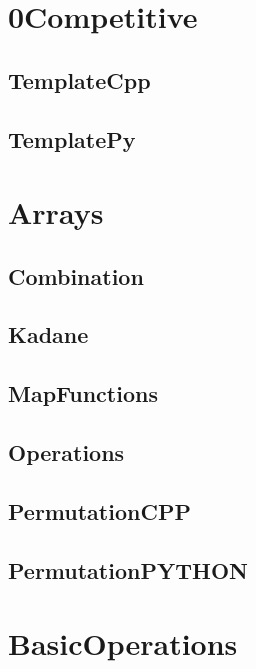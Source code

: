\section{0Competitive}
\subsection{ TemplateCpp}
\raggedbottom
\hrulefill
\subsection{ TemplatePy}
\raggedbottom
\hrulefill

\section{Arrays}
\subsection{ Combination}
\raggedbottom
\hrulefill
\subsection{ Kadane}
\raggedbottom
\hrulefill
\subsection{ MapFunctions}
\raggedbottom
\hrulefill
\subsection{ Operations}
\raggedbottom
\hrulefill
\subsection{ PermutationCPP}
\raggedbottom
\hrulefill
\subsection{ PermutationPYTHON}
\raggedbottom
\hrulefill

\section{BasicOperations}
